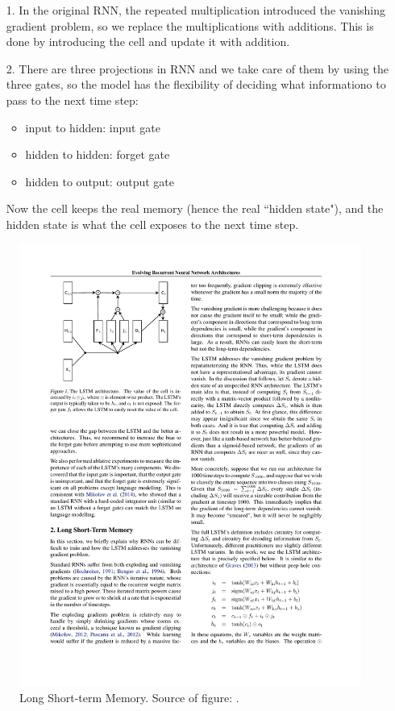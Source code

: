 \begin{itemize}
    \item[1.] In the original RNN, the repeated multiplication introduced the vanishing gradient problem, so we replace the multiplications with additions. This is done by introducing the cell and update it with addition.
    \item[2.] There are three projections in RNN and we take care of them by using the three gates, so the model has the flexibility of deciding what informationo to pass to the next time step:
        \begin{itemize}
            \item input to hidden: input gate
            \item hidden to hidden: forget gate
            \item hidden to output: output gate
        \end{itemize}
    Now the cell keeps the real memory (hence the real ``hidden state"), and the hidden state is what the cell exposes to the next time step.
\end{itemize}

\begin{figure}
\centering
\includegraphics[width=0.7\columnwidth]{figures/methods/LSTM}
\caption{Long Short-term Memory. Source of figure: \cite{jozefowicz2015empirical}.}
\label{fig:methods:LSTM}
\end{figure}

